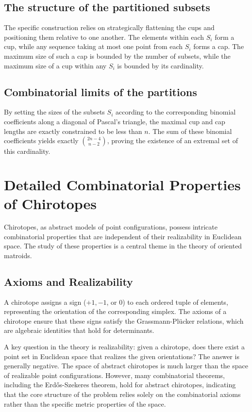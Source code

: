 \documentclass[11pt,a4paper]{article}
\begin{document}
\subsection{The structure of the partitioned subsets}
The specific construction relies on strategically flattening the cups and positioning them relative to one another. The elements within each $S_i$ form a cup, while any sequence taking at most one point from each $S_i$ forms a cap. The maximum size of such a cap is bounded by the number of subsets, while the maximum size of a cup within any $S_i$ is bounded by its cardinality.

\subsection{Combinatorial limits of the partitions}
By setting the sizes of the subsets $S_i$ according to the corresponding binomial coefficients along a diagonal of Pascal's triangle, the maximal cup and cap lengths are exactly constrained to be less than $n$. The sum of these binomial coefficients yields exactly $\binom{2n-4}{n-2}$, proving the existence of an extremal set of this cardinality.

\section{Detailed Combinatorial Properties of Chirotopes}
Chirotopes, as abstract models of point configurations, possess intricate combinatorial properties that are independent of their realizability in Euclidean space. The study of these properties is a central theme in the theory of oriented matroids.

\subsection{Axioms and Realizability}
A chirotope assigns a sign ($+1, -1$, or $0$) to each ordered tuple of elements, representing the orientation of the corresponding simplex. The axioms of a chirotope ensure that these signs satisfy the Grassmann-Pl\"ucker relations, which are algebraic identities that hold for determinants.

A key question in the theory is realizability: given a chirotope, does there exist a point set in Euclidean space that realizes the given orientations? The answer is generally negative. The space of abstract chirotopes is much larger than the space of realizable point configurations. However, many combinatorial theorems, including the Erd\H{o}s-Szekeres theorem, hold for abstract chirotopes, indicating that the core structure of the problem relies solely on the combinatorial axioms rather than the specific metric properties of the space.
\end{document}
